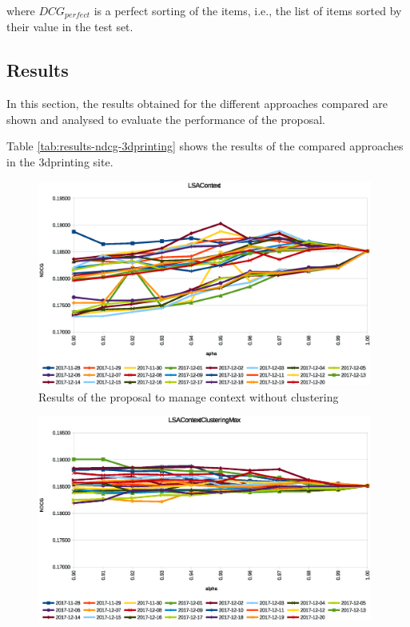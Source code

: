 \documentclass[preprint]{elsarticle}
\begin{document}
\begin{spacing}{1.5}
\noindent where $DCG_{perfect}$ is a perfect sorting of the items, i.e., the list of items sorted by their value in the test set.

\subsection{Results}

In this section, the results obtained for the different approaches compared are shown and analysed to evaluate the performance of the proposal.

Table \ref{tab:results-ndcg-3dprinting} shows the results of the compared approaches in the 3dprinting site.

\begin{figure}[htb]
    \centering
    \includegraphics[width=0.98\textwidth]{figures/ndcg-results-proposal-context-no-clustering.eps}
    \caption{Results of the proposal to manage context without clustering}
    \label{fig:ndcg-results-proposal-context-no-clustering}
\end{figure}
\begin{figure}[htb]
    \centering
    \includegraphics[width=0.98\textwidth]{figures/ndcg-results-proposal-context-fuzzy-clustering-max.eps}

\end{figure}
\end{spacing}
\end{document}
